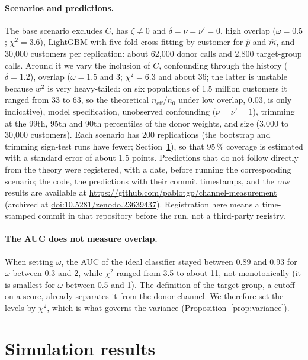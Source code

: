 \documentclass[twoside,11pt]{article}
\newcommand{\neff}{n_{\mathrm{eff}}}
\theoremstyle{plain}
\theoremstyle{definition}
\begin{document}
\paragraph{Scenarios and predictions.} The base scenario excludes $C$, has $\zeta\ne0$ and $\delta=\nu=\nu'=0$, high overlap ($\omega=0.5$; $\chi^2=3.6$), LightGBM \citep{ke2017} with five-fold cross-fitting by customer for $\hat p$ and $\hat m$, and 30{,}000 customers per replication: about 62{,}000 donor calls and 2{,}800 target-group calls. Around it we vary the inclusion of $C$, confounding through the history ($\delta=1.2$), overlap ($\omega=1.5$ and $3$; $\chi^2=6.3$ and about 36; the latter is unstable because $w^2$ is very heavy-tailed: on six populations of 1.5 million customers it ranged from 33 to 63, so the theoretical $\neff/n_0$ under low overlap, 0.03, is only indicative), model specification, unobserved confounding ($\nu=\nu'=1$), trimming at the 99th, 95th and 90th percentiles of the donor weights, and size (3{,}000 to 30{,}000 customers). Each scenario has 200 replications (the bootstrap and trimming sign-test runs have fewer; Section~\ref{sec:results}), so that 95\,\% coverage is estimated with a standard error of about 1.5 points. Predictions that do not follow directly from the theory were registered, with a date, before running the corresponding scenario; the code, the predictions with their commit timestamps, and the raw results are available at \url{https://github.com/pablotgp/channel-measurement} (archived at \href{https://doi.org/10.5281/zenodo.23639437}{doi:10.5281/zenodo.23639437}). Registration here means a time-stamped commit in that repository before the run, not a third-party registry.

\paragraph{The AUC does not measure overlap.} When setting $\omega$, the AUC of the ideal classifier stayed between 0.89 and 0.93 for $\omega$ between 0.3 and 2, while $\chi^2$ ranged from 3.5 to about 11, not monotonically (it is smallest for $\omega$ between 0.5 and 1). The definition of the target group, a cutoff on a score, already separates it from the donor channel. We therefore set the levels by $\chi^2$, which is what governs the variance (Proposition~\ref{prop:variance}).
\section{Simulation results}\label{sec:results}
\end{document}

